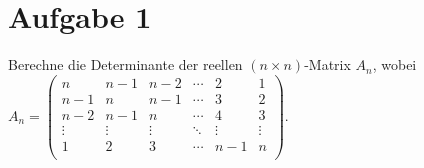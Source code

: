 \documentclass{scrartcl}
\begin{document}
\section*{Aufgabe 1}

Berechne die Determinante der reellen $(n \times n)$-Matrix $A_n$, wobei \\
$A_n =
\begin{pmatrix} n & n-1 & n-2 & \cdots & 2 & 1 \\
							 n-1 & n & n-1 & \cdots & 3 & 2 \\
							 n-2 & n-1 & n & \cdots & 4 & 3 \\
							 \vdots & \vdots & \vdots & \ddots & \vdots & \vdots \\
							 1 & 2 & 3 & \cdots & n-1 & n \\
\end{pmatrix}.$
\end{document}

